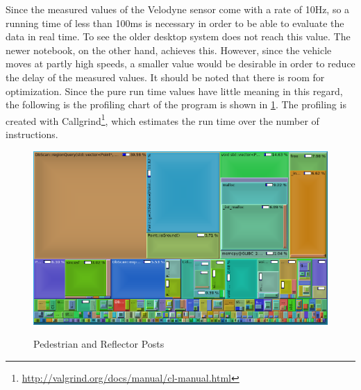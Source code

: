 \documentclass[11pt,oneside,openright]{mpreport}
\begin{document}
Since the measured values of the Velodyne sensor come with a rate of 10Hz, so a running time of less than 100ms is necessary in order to be able to evaluate the data 
in real time. To see the older desktop system does not reach this value. The newer notebook, on the other hand, achieves this. 
However, since the vehicle moves at partly high speeds, a smaller value would be desirable in order to reduce the delay of the measured values. 
It should be noted that there is room for optimization. Since the pure run time values have little meaning in this regard, 
the following is the profiling chart of the program is shown in \cref{profiling}. 
The profiling is created with Callgrind\footnote{\url{http://valgrind.org/docs/manual/cl-manual.html}}, which estimates the run time over the number of instructions.


\begin{figure}[!htb]
  \caption{Pedestrian and Reflector Posts} 
  \centering
  \includegraphics[width=\textwidth]{bilder/call.png}
 \label{profiling}
\end{figure}
\end{document}
